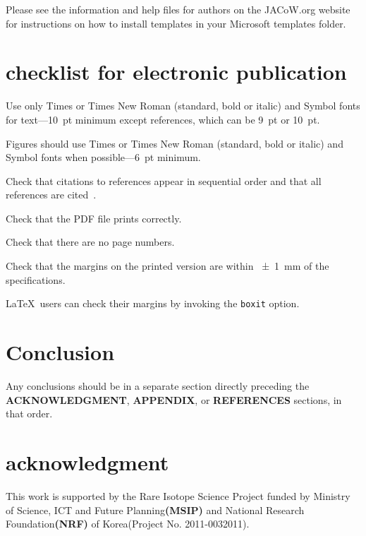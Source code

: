 \documentclass[a4paper,
              ]{jacow}
\newcommand\SEC[1]{\textbf{\uppercase{#1}}}
\begin{document}
Please see the information and help files for authors on the JACoW.org website
for instructions  on  how to install templates in your Microsoft templates folder.

\section{checklist for electronic publication}

\begin{Itemize}
    \item  Use only Times or Times New Roman (standard, bold or italic) and Symbol
           fonts for text---\SI{10}{pt} minimum except references, which can be \SI{9}{pt} or \SI{10}{pt}.
    \item  Figures should use Times or Times New Roman (standard, bold or italic) and
           Symbol fonts when possible---\SI{6}{pt} minimum.
    \item  Check that citations to references appear in sequential order and
           that all references are cited~\cite{exampl-last}.
    \item  Check that the PDF file prints correctly.
    \item  Check that there are no page numbers.
    \item  Check that the margins on the printed version are within \SI{\pm1}{mm}
           of the specifications.
    \item  \LaTeX\ users can check their margins by invoking the
           \texttt{boxit} option.
\end{Itemize}

\section{Conclusion}

Any conclusions should be in a separate section directly preceding
the \SEC{Acknowledgment}, \SEC{Appendix}, or \SEC{References} sections, in that
order.

\section{acknowledgment}
This work is supported by the Rare Isotope Science Project funded by Ministry of Science, ICT and Future Planning\SEC{(MSIP)} and National Research Foundation\SEC{(NRF)} of Korea(Project No. 2011-0032011).

%
%
\iftrue   %
	\newpage
	\raggedend
\fi
\end{document}
